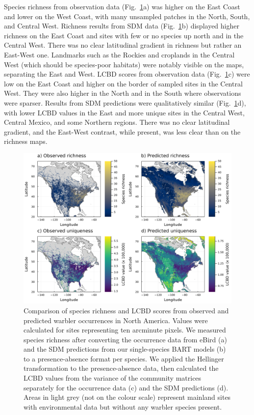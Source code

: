 \documentclass[10pt,oneside]{article}
\makeatletter
\def\maxwidth{\ifdim\Gin@nat@width>\linewidth\linewidth
\else\Gin@nat@width\fi}
\let\Oldincludegraphics\includegraphics
\renewcommand{\includegraphics}[1]{\Oldincludegraphics[width=\maxwidth]{#1}}
\makeatother
\begin{document}
Species richness from observation data (Fig.~\ref{fig:maps}a) was higher
on the East Coast and lower on the West Coast, with many unsampled
patches in the North, South, and Central West. Richness results from SDM
data (Fig.~\ref{fig:maps}b) displayed higher richness on the East Coast
and sites with few or no species up north and in the Central West. There
was no clear latitudinal gradient in richness but rather an East-West
one. Landmarks such as the Rockies and croplands in the Central West
(which should be species-poor habitats) were notably visible on the
maps, separating the East and West. LCBD scores from observation data
(Fig.~\ref{fig:maps}c) were low on the East Coast and higher on the
border of sampled sites in the Central West. They were also higher in
the North and in the South where observations were sparser. Results from
SDM predictions were qualitatively similar (Fig.~\ref{fig:maps}d), with
lower LCBD values in the East and more unique sites in the Central West,
Central Mexico, and some Northern regions. There was no clear
latitudinal gradient, and the East-West contrast, while present, was
less clear than on the richness maps.

\begin{figure}
\hypertarget{fig:maps}{%
\centering
\includegraphics{figures/comparison-combined.png}
\caption{Comparison of species richness and LCBD scores from observed
and predicted warbler occurrences in North America. Values were
calculated for sites representing ten arcminute pixels. We measured
species richness after converting the occurrence data from eBird (a) and
the SDM predictions from our single-species BART models (b) to a
presence-absence format per species. We applied the Hellinger
transformation to the presence-absence data, then calculated the LCBD
values from the variance of the community matrices separately for the
occurrence data (c) and the SDM predictions (d). Areas in light grey
(not on the colour scale) represent mainland sites with environmental
data but without any warbler species present.}\label{fig:maps}
}
\end{figure}
\end{document}
